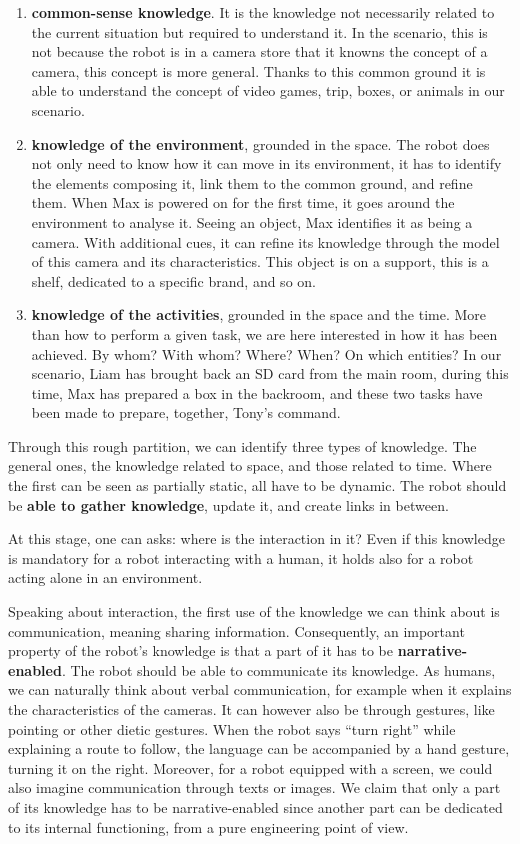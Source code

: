 \begin{enumerate}
  \item \textbf{common-sense knowledge}. It is the knowledge not necessarily related to the current situation but required to understand it. In the scenario, this is not because the robot is in a camera store that it knowns the concept of a camera, this concept is more general. Thanks to this common ground it is able to understand the concept of video games, trip, boxes, or animals in our scenario.
  \item \textbf{knowledge of the environment}, grounded in the space. The robot does not only need to know how it can move in its environment, it has to identify the elements composing it, link them to the common ground, and refine them. When Max is powered on for the first time, it goes around the environment to analyse it. Seeing an object, Max identifies it as being a camera. With additional cues, it can refine its knowledge through the model of this camera and its characteristics. This object is on a support, this is a shelf, dedicated to a specific brand, and so on.
  \item \textbf{knowledge of the activities}, grounded in the space and the time. More than how to perform a given task, we are here interested in how it has been achieved. By whom? With whom? Where? When? On which entities? In our scenario, Liam has brought back an SD card from the main room, during this time, Max has prepared a box in the backroom, and these two tasks have been made to prepare, together, Tony's command.
\end{enumerate}

Through this rough partition, we can identify three types of knowledge. The general ones, the knowledge related to space, and those related to time. Where the first can be seen as partially static, all have to be dynamic. The robot should be \textbf{able to gather knowledge}, update it, and create links in between.

At this stage, one can asks: where is the interaction in it? Even if this knowledge is mandatory for a robot interacting with a human, it holds also for a robot acting alone in an environment.

Speaking about interaction, the first use of the knowledge we can think about is communication, meaning sharing information. Consequently, an important property of the robot's knowledge is that a part of it has to be \textbf{narrative-enabled}. The robot should be able to communicate its knowledge. As humans, we can naturally think about verbal communication, for example when it explains the characteristics of the cameras. It can however also be through gestures, like pointing or other dietic gestures. When the robot says ``turn right'' while explaining a route to follow, the language can be accompanied by a hand gesture, turning it on the right. Moreover, for a robot equipped with a screen, we could also imagine communication through texts or images. We claim that only a part of its knowledge has to be narrative-enabled since another part can be dedicated to its internal functioning, from a pure engineering point of view.

